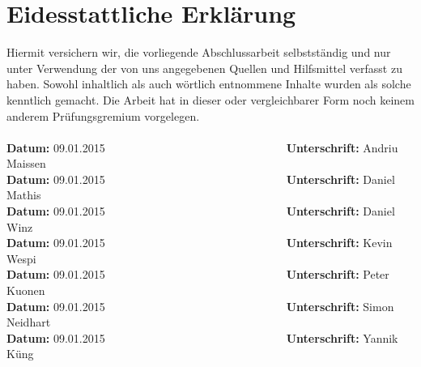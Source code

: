 \section*{Eidesstattliche Erklärung}
\label{erklaerung}
Hiermit versichern wir, die vorliegende Abschlussarbeit selbstständig und nur 
unter Verwendung der von uns angegebenen Quellen und Hilfsmittel verfasst zu 
haben. Sowohl inhaltlich als auch wörtlich entnommene Inhalte wurden als 
solche kenntlich gemacht. Die Arbeit hat in dieser oder vergleichbarer Form 
noch keinem anderem Prüfungsgremium vorgelegen. \\
\\[1.5cm]
\textbf{Datum:}	09.01.2015~~~~~~~~~~~~~~~~~~~~~~~~~~~~~~~~\textbf{Unterschrift:} Andriu Maissen
\\[1.5cm]
\textbf{Datum:}	09.01.2015~~~~~~~~~~~~~~~~~~~~~~~~~~~~~~~~\textbf{Unterschrift:} Daniel Mathis
\\[1.5cm]
\textbf{Datum:}	09.01.2015~~~~~~~~~~~~~~~~~~~~~~~~~~~~~~~~\textbf{Unterschrift:} Daniel Winz
\\[1.5cm]
\textbf{Datum:}	09.01.2015~~~~~~~~~~~~~~~~~~~~~~~~~~~~~~~~\textbf{Unterschrift:} Kevin Wespi
\\[1.5cm]
\textbf{Datum:}	09.01.2015~~~~~~~~~~~~~~~~~~~~~~~~~~~~~~~~\textbf{Unterschrift:} Peter Kuonen
\\[1.5cm]
\textbf{Datum:}	09.01.2015~~~~~~~~~~~~~~~~~~~~~~~~~~~~~~~~\textbf{Unterschrift:} Simon Neidhart
\\[1.5cm]
\textbf{Datum:}	09.01.2015~~~~~~~~~~~~~~~~~~~~~~~~~~~~~~~~\textbf{Unterschrift:} Yannik Küng
